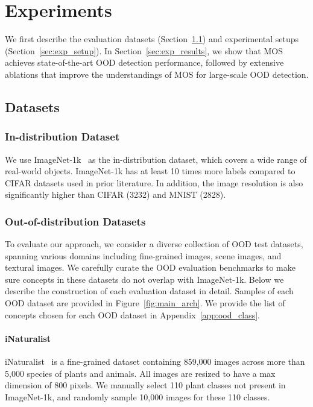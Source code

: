\documentclass[final]{cvpr}
\begin{document}
\section{Experiments}
\vspace{-0.1cm}
We first describe the evaluation datasets (Section~\ref{sec:dataset}) and  experimental setups (Section~\ref{sec:exp_setup}). In Section~\ref{sec:exp_results}, we show that MOS achieves state-of-the-art OOD detection performance, followed by extensive ablations that improve the understandings of MOS for large-scale OOD detection.

\subsection{Datasets}
\label{sec:dataset}

\subsubsection{In-distribution Dataset}
\vspace{-0.2cm}
We use ImageNet-1k~\cite{deng2009imagenet} as the in-distribution dataset, which covers a wide range of real-world objects. ImageNet-1k has at least 10 times more labels compared to CIFAR datasets used in prior literature. In addition, the image resolution is also significantly higher than CIFAR (3232) and MNIST (2828). 


\vspace{-0.4cm}
\subsubsection{Out-of-distribution Datasets}
\vspace{-0.2cm}
To evaluate our approach, we consider a diverse collection of OOD test datasets, spanning various domains including fine-grained images, scene images, and textural images. We carefully curate the OOD evaluation benchmarks to make sure concepts in these datasets do not overlap with ImageNet-1k. Below we describe the construction of each evaluation dataset in detail. Samples of each OOD dataset are provided in Figure~\ref{fig:main_arch}. We provide the list of concepts chosen for each OOD dataset in Appendix~\ref{app:ood_class}.


\vspace{-0.4cm}
\paragraph{iNaturalist} iNaturalist~\cite{van2018inaturalist} is a fine-grained dataset containing 859,000 images across more than 5,000 species of plants and animals. All images are resized to have a max dimension of 800 pixels. We manually select 110 plant classes not present in ImageNet-1k, and randomly sample 10,000 images for these 110 classes. \vspace{-0.4cm}
\end{document}
